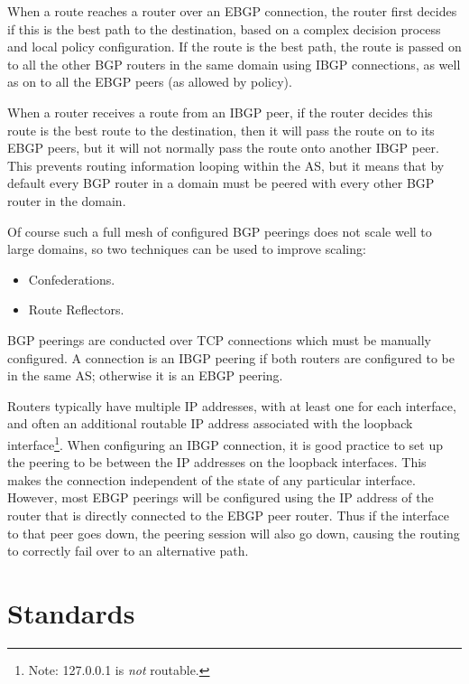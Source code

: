 When a route reaches a router over an EBGP connection, the router
first decides if this is the best path to the destination, based on a
complex decision process and local policy configuration.  If the route
is the best path, the route is passed on to all the other BGP routers
in the same domain using IBGP connections, as well as on to all the
EBGP peers (as allowed by policy).

When a router receives a route from an IBGP peer, if the router decides
this route is the best route to the destination, then it will pass the
route on to its EBGP peers, but it will not normally pass the route
onto another IBGP peer.  This prevents routing information looping
within the AS, but it means that by default every BGP router in a
domain must be peered with every other BGP router in the domain.

Of course such a full mesh of configured BGP peerings does not scale
well to large domains, so two techniques can be used to improve
scaling:
\begin{itemize}
\item Confederations.
\item Route Reflectors.
\end{itemize}

BGP peerings are conducted over TCP connections which must be manually
configured.  A connection is an IBGP peering if both routers are
configured to be in the same AS; otherwise it is an EBGP peering.

Routers typically have multiple IP addresses, with at least one for
each interface, and often an additional routable IP address associated
with the loopback interface\footnote{Note: 127.0.0.1 is {\it not} routable.}.
When configuring an IBGP connection, it is good practice to set up the
peering to be between the IP addresses on the loopback interfaces.
This makes the connection independent of the state of any particular
interface.  However, most EBGP peerings will be configured using the
IP address of the router that is directly connected to the EBGP peer
router.  Thus if the interface to that peer goes down, the peering
session will also go down, causing the routing to correctly fail over
to an alternative path.

\section{Standards}

